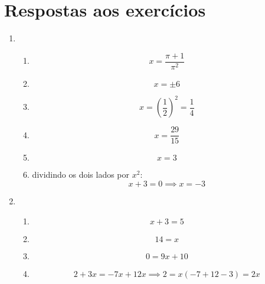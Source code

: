 \documentclass[12pt]{article}
\begin{document}
\section{Respostas aos exercícios}
\begin{enumerate}
	\item
	\begin{enumerate}
		\item $$x = \frac{\pi + 1}{{\pi}^2}$$
		\item $$x = \pm 6$$
		\item $$x = {\left(\frac{1}{2}\right)}^2 = \frac{1}{4}$$
		\item $$x = \frac{29}{15}$$
		\item $$x = 3$$
		\item dividindo os dois lados por $x^2$: $$x + 3 = 0 \implies x = -3$$
	\end{enumerate}	

	\item
	\begin{enumerate}
		\item $$x + 3 = 5$$
		\item $$14 = x$$
		\item $$0 = 9x + 10$$
		\item $$2 + 3x = -7x + 12x \implies 2 = x(-7 + 12 - 3) = 2x$$
	\end{enumerate}
\end{enumerate}
\end{document}

